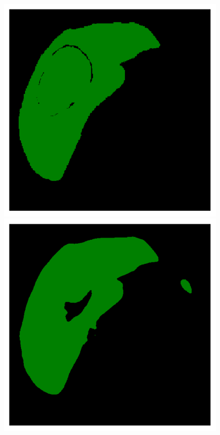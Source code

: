 \begin{figure}[!ht]
\begin{minipage}{4cm}
	\end{minipage} \hspace{-0.3cm}
	\begin{minipage}{4cm}
		\includegraphics[width=\linewidth]{images/ResizeLiverVE_GT_Pat6_6}
	\end{minipage} \hspace{-0.3cm}
	\begin{minipage}{4cm}
		\includegraphics[width=\linewidth]{images/ResizeLiverVE_Pred_Pat6_6}

\end{minipage}
\end{figure}
